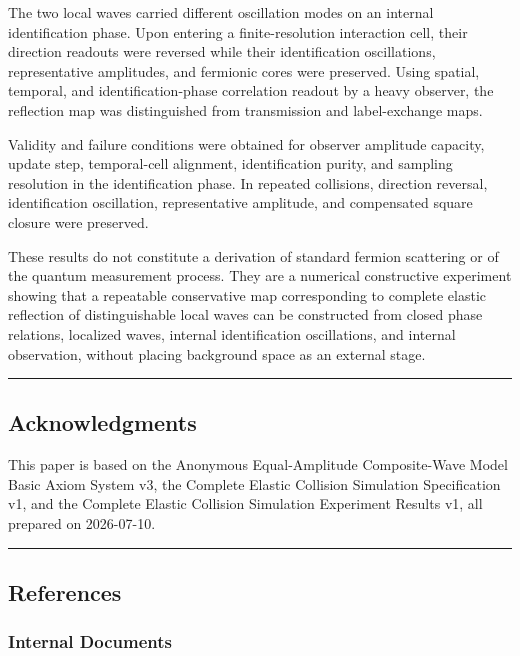 \documentclass[
  a4paper,
]{article}
\begin{document}
The two local waves carried different oscillation modes on an internal
identification phase. Upon entering a finite-resolution interaction
cell, their direction readouts were reversed while their identification
oscillations, representative amplitudes, and fermionic cores were
preserved. Using spatial, temporal, and identification-phase correlation
readout by a heavy observer, the reflection map was distinguished from
transmission and label-exchange maps.

Validity and failure conditions were obtained for observer amplitude
capacity, update step, temporal-cell alignment, identification purity,
and sampling resolution in the identification phase. In repeated
collisions, direction reversal, identification oscillation,
representative amplitude, and compensated square closure were preserved.

These results do not constitute a derivation of standard fermion
scattering or of the quantum measurement process. They are a numerical
constructive experiment showing that a repeatable conservative map
corresponding to complete elastic reflection of distinguishable local
waves can be constructed from closed phase relations, localized waves,
internal identification oscillations, and internal observation, without
placing background space as an external stage.

\begin{center}\rule{0.5\linewidth}{0.5pt}\end{center}

\subsection{Acknowledgments}\label{acknowledgments}

This paper is based on the Anonymous Equal-Amplitude Composite-Wave
Model Basic Axiom System v3, the Complete Elastic Collision Simulation
Specification v1, and the Complete Elastic Collision Simulation
Experiment Results v1, all prepared on 2026-07-10.

\begin{center}\rule{0.5\linewidth}{0.5pt}\end{center}

\subsection{References}\label{references}

\subsubsection{Internal Documents}\label{internal-documents}
\end{document}
